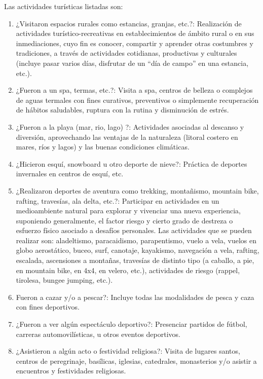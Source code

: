 \documentclass[
  openany]{book}
\providecommand{\tightlist}{%
  \setlength{\itemsep}{0pt}\setlength{\parskip}{0pt}}
\begin{document}
Las actividades turísticas listadas son:

\begin{enumerate}
\def\labelenumi{\arabic{enumi}.}
\tightlist
\item
  ¿Visitaron espacios rurales como estancias, granjas, etc.?: Realización de actividades turístico-recreativas en establecimientos de ámbito rural o en sus inmediaciones, cuyo fin es conocer, compartir y aprender otras costumbres y tradiciones, a través de actividades cotidianas, productivas y culturales (incluye pasar varios días, disfrutar de un ``día de campo'' en una estancia, etc.).
\item
  ¿Fueron a un spa, termas, etc.?: Visita a spa, centros de belleza o complejos de aguas termales con fines curativos, preventivos o simplemente recuperación de hábitos saludables, ruptura con la rutina y disminución de estrés.
\item
  ¿Fueron a la playa (mar, rio, lago) ?: Actividades asociadas al descanso y diversión, aprovechando las ventajas de la naturaleza (litoral costero en mares, ríos y lagos) y las buenas condiciones climáticas.
\item
  ¿Hicieron esquí, snowboard u otro deporte de nieve?: Práctica de deportes invernales en centros de esquí, etc.
\item
  ¿Realizaron deportes de aventura como trekking, montañismo, mountain bike, rafting, travesías, ala delta, etc.?: Participar en actividades en un medioambiente natural para explorar y vivenciar una nueva experiencia, suponiendo generalmente, el factor riesgo y cierto grado de destreza o esfuerzo físico asociado a desafíos personales. Las actividades que se pueden realizar son: aladeltismo, paracaidismo, parapentismo, vuelo a vela, vuelos en globo aerostático, buceo, surf, canotaje, kayakismo, navegación a vela, rafting, escalada, ascensiones a montañas, travesías de distinto tipo (a caballo, a pie, en mountain bike, en 4x4, en velero, etc.), actividades de riesgo (rappel, tirolesa, bungee jumping, etc.).
\item
  Fueron a cazar y/o a pescar?: Incluye todas las modalidades de pesca y caza con fines deportivos.
\item
  ¿Fueron a ver algún espectáculo deportivo?: Presenciar partidos de fútbol, carreras automovilísticas, u otros eventos deportivos.
\item
  ¿Asistieron a algún acto o festividad religiosa?: Visita de lugares santos, centros de peregrinaje, basílicas, iglesias, catedrales, monasterios y/o asistir a encuentros y festividades religiosas.

\end{enumerate}
\end{document}
